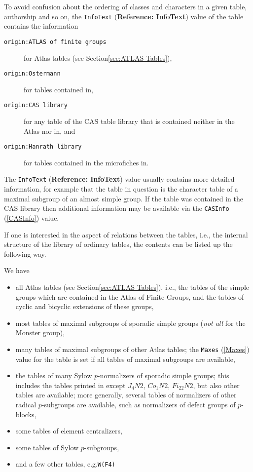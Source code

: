 \documentclass[a4paper,11pt]{report}
\begin{document}
{{{ To avoid confusion about the ordering of classes and characters in a given
table, authorship and so on, the \texttt{InfoText} (\textbf{Reference: InfoText}) value of the table contains the information 
\begin{description}
\item[{\texttt{origin:{\nobreakspace}ATLAS of finite groups}}]  for \textsf{Atlas} tables (see Section{\nobreakspace}\ref{sec:ATLAS Tables}), 
\item[{\texttt{origin:{\nobreakspace}Ostermann}}]  for tables contained in{\nobreakspace}\cite{Ost86}, 
\item[{\texttt{origin:{\nobreakspace}CAS library}}]  for any table of the \textsf{CAS} table library that is contained neither in the \textsf{Atlas} nor in{\nobreakspace}\cite{Ost86}, and 
\item[{\texttt{origin:{\nobreakspace}Hanrath library}}]  for tables contained in the microfiches in{\nobreakspace}\cite{HP89}. 
\end{description}
 The \texttt{InfoText} (\textbf{Reference: InfoText}) value usually contains more detailed information, for example that the table
in question is the character table of a maximal subgroup of an almost simple
group. If the table was contained in the \textsf{CAS} library then additional information may be available via the \texttt{CASInfo} (\ref{CASInfo}) value. 

 If one is interested in the aspect of relations between the tables,
i.{\nobreakspace}e., the internal structure of the library of ordinary tables,
the contents can be listed up the following way. 

 We have 
\begin{itemize}
\item  all \textsf{Atlas} tables (see Section{\nobreakspace}\ref{sec:ATLAS Tables}), i.{\nobreakspace}e., the tables of the simple groups which are contained in
the \textsf{Atlas} of Finite Groups, and the tables of cyclic and bicyclic extensions of these
groups, 
\item  most tables of maximal subgroups of sporadic simple groups (\emph{not all} for the Monster group), 
\item  many tables of maximal subgroups of other \textsf{Atlas} tables; the \texttt{Maxes} (\ref{Maxes}) value for the table is set if all tables of maximal subgroups are available, 
\item  the tables of many Sylow $p$-normalizers of sporadic simple groups; this includes the tables printed
in{\nobreakspace}\cite{Ost86} except $J_4N2$, $Co_1N2$, $Fi_{22}N2$, but also other tables are available; more generally, several tables of
normalizers of other radical $p$-subgroups are available, such as normalizers of defect groups of $p$-blocks, 
\item  some tables of element centralizers, 
\item  some tables of Sylow $p$-subgroups, 
\item  and a few other tables, e.{\nobreakspace}g.{\nobreakspace}\texttt{W(F4)}  
\end{itemize}
 

}}}
\end{document}
